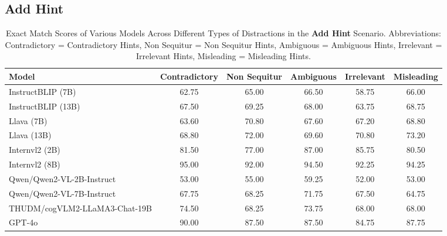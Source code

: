 \subsection{Add Hint}

\begin{table*}[h!]
  \centering
  \caption{Exact Match Scores of Various Models Across Different Types of Distractions in the \textbf{Add Hint} Scenario. Abbreviations: Contradictory = Contradictory Hints, Non Sequitur = Non Sequitur Hints, Ambiguous = Ambiguous Hints, Irrelevant = Irrelevant Hints, Misleading = Misleading Hints.}
  \label{tab:performance_metrics_details_add_hint}
  \begin{tabular}{l *{5}{S[table-format=2.2]}}
    \toprule
    \textbf{Model} & \textbf{Contradictory} & \textbf{Non Sequitur} & \textbf{Ambiguous} & \textbf{Irrelevant} & \textbf{Misleading} \\
    \midrule
    InstructBLIP (7B)                      & 62.75 & 65.00 & 66.50 & 58.75 & 66.00 \\
    InstructBLIP (13B)                     & 67.50 & 69.25 & 68.00 & 63.75 & 68.75 \\
    Llava (7B)                             & 63.60 & 70.80 & 67.60 & 67.20 & 68.80 \\
    Llava (13B)                            & 68.80 & 72.00 & 69.60 & 70.80 & 73.20 \\
    Internvl2 (2B)                         & 81.50 & 77.00 & 87.00 & 85.75 & 80.50 \\
    Internvl2 (8B)                         & 95.00 & 92.00 & 94.50 & 92.25 & 94.25 \\
    Qwen/Qwen2-VL-2B-Instruct               & 53.00 & 55.00 & 59.25 & 52.00 & 53.00 \\
    Qwen/Qwen2-VL-7B-Instruct               & 67.75 & 68.25 & 71.75 & 67.50 & 64.75 \\
    THUDM/cogVLM2-LLaMA3-Chat-19B          & 74.50 & 68.25 & 73.75 & 68.00 & 68.00 \\
     GPT-4o                                 & 90.00 & 87.50 & 87.50 & 84.75 & 87.75 \\
    \bottomrule
  \end{tabular}
\end{table*}



